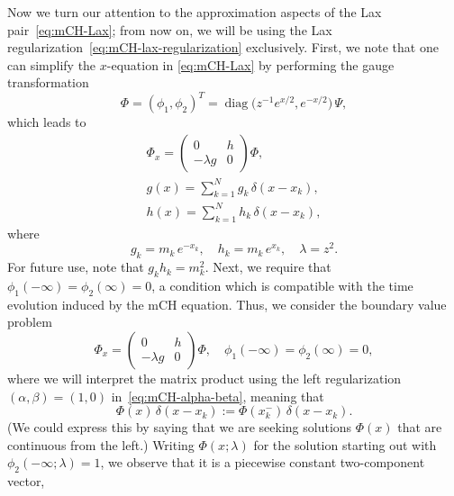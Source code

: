 \documentclass[10pt,a4paper]{article} \pdfoutput=1 
\begin{document}
Now we turn our attention to the approximation aspects of the Lax pair~\eqref{eq:mCH-Lax};
from now on, we will be using the Lax regularization~\eqref{eq:mCH-lax-regularization} exclusively.
First, we note that one can simplify the $x$-equation in \eqref{eq:mCH-Lax} by performing the gauge transformation
\begin{equation}
  \Phi
  = (\phi_1, \phi_2)^T
  = \operatorname{diag} \bigl( z^{-1} e^{x/2}, e^{-x/2} \bigr) \, \Psi
  ,
\end{equation}
which leads to
\begin{equation}
  \label{eq:mCH-xLax}
  \begin{aligned}
    \Phi_x = \begin{pmatrix} 0 & h \\ -\lambda g & 0 \end{pmatrix} \Phi
    , \\
    g(x) = \sum_{k=1}^N g_k \, \delta(x-x_k)
    , \\
    h(x) = \sum_{k=1}^N h_k \, \delta(x-x_k)
    ,
  \end{aligned}
\end{equation}
where
\begin{equation}
  \label{eq:mCH-gk-hk}
  g_k = m_k \, e^{-x_k}
  , \quad
  h_k = m_k \, e^{x_k}
  , \quad
  \lambda = z^2
  .
\end{equation}
For future use, note that $g_k h_k = m_k^2$.
Next, we require that
$\phi_1(-\infty) = \phi_2(\infty) = 0$,
a condition which is compatible with the time evolution induced by the mCH equation.
Thus, we consider the boundary value problem
\begin{equation}
  \label{eq:mCH-xLaxBVP-}
  \Phi_x = \begin{pmatrix} 0 & h \\ -\lambda g & 0 \end{pmatrix} \Phi
  ,\quad
  \phi_1(-\infty) = \phi_2(\infty) = 0
  ,
\end{equation}
where we will interpret the matrix product using the left regularization $(\alpha, \beta) = (1,0)$ in~\eqref{eq:mCH-alpha-beta},
meaning that
\begin{equation}
  \label{eq:mCH-left-regularization}
  \Phi(x) \, \delta(x-x_k) := \Phi(x_k^-) \, \delta(x-x_k)
  .
\end{equation}
(We could express this by saying that we are seeking solutions $\Phi(x)$ that are continuous from the left.)
Writing $\Phi(x;\lambda)$ for the solution starting out with
$\phi_2(-\infty;\lambda) = 1$,
we observe that it is a piecewise constant two-component vector,
\end{document}
